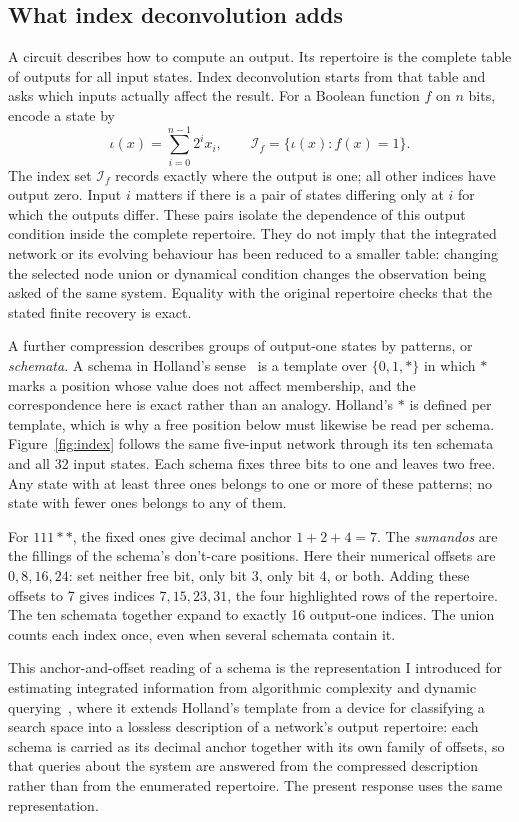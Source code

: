 \documentclass[11pt,a4paper]{article}
\begin{document}
\subsection{What index deconvolution adds}
A circuit describes how to compute an output. Its repertoire is the complete
table of outputs for all input states. Index deconvolution starts from that
table and asks which inputs actually affect the result. For a Boolean
function $f$ on $n$ bits, encode a state by
\begin{equation}\label{eq:index}
\iota(x)=\sum_{i=0}^{n-1}2^ix_i,\qquad
\mathcal I_f=\{\iota(x):f(x)=1\}.
\end{equation}
The index set $\mathcal I_f$ records exactly where the output is one; all
other indices have output zero. Input $i$ matters if there is a pair of
states differing only at $i$ for which the outputs differ. These pairs
isolate the dependence of this output condition inside the complete
repertoire. They do not imply that the integrated network or its evolving
behaviour has been reduced to a smaller table: changing the selected node
union or dynamical condition changes the observation being asked of the same
system. Equality with the original repertoire checks that the stated finite
recovery is exact.

A further compression describes groups of output-one states by patterns,
or \emph{schemata}. A schema in Holland's sense~\cite{holland1975} is a
template over $\{0,1,*\}$ in which $*$ marks a position whose value does not
affect membership, and the correspondence here is exact rather than an
analogy. Holland's $*$ is defined per template, which is why a free position
below must likewise be read per schema. Figure~\ref{fig:index} follows the
same five-input network through its ten schemata and all 32 input states.
Each schema fixes three bits to one and leaves two free. Any state with at
least three ones belongs to one or more of these patterns; no state with
fewer ones belongs to any of them.

For $111**$, the fixed ones give decimal anchor $1+2+4=7$.
The \emph{sumandos} are the fillings of the schema's don't-care positions.
Here their numerical offsets are $0,8,16,24$: set neither free bit,
only bit 3, only bit 4, or both. Adding these offsets to 7 gives indices
$7,15,23,31$, the four highlighted rows of the repertoire. The ten
schemata together expand to exactly 16 output-one indices. The union
counts each index once, even when several schemata contain it.

This anchor-and-offset reading of a schema is the representation I introduced
for estimating integrated information from algorithmic complexity and dynamic
querying~\cite{hernandez2019aid,hernandez2021aid}, where it extends Holland's
template from a device for classifying a search space into a lossless
description of a network's output repertoire: each schema is carried as its
decimal anchor together with its own family of offsets, so that queries about
the system are answered from the compressed description rather than from the
enumerated repertoire. The present response uses the same representation.
\end{document}
